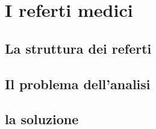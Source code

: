 \chapter{I referti medici}

\section{La struttura dei referti}

\section{Il problema dell'analisi}

\section{la soluzione}